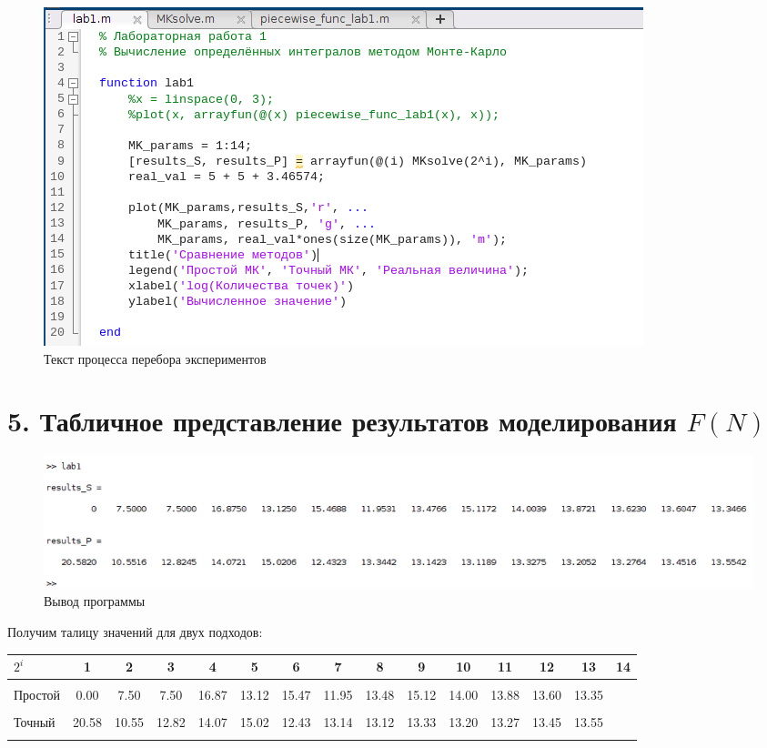 \documentclass[12pt]{article}
\begin{document}
\begin{figure}[!h]
	\centering
	\includegraphics[width=\linewidth]{lab1.png}
	\caption{Текст процесса перебора экспериментов}
\end{figure}


 
\newpage
 \section*{5. Табличное представление результатов моделирования $F(N)$}
 
\begin{figure}[!h]
	\centering
	\includegraphics[width=\linewidth]{output.png}
	\caption{Вывод программы}
\end{figure}
Получим талицу значений для двух подходов:
\begin{center}
	\begin{tabular}[c]{lcccccccccccccc}
  		$2^i$ & 1 & 2 & 3 & 4 & 5 & 6 & 7 & 8 & 9 & 10 & 11 & 12 & 13 & 14\\[2mm]\hline
  		&&&\\
		Простой & 0.00 & 7.50 & 7.50 & 16.87 & 13.12 & 15.47 & 11.95 & 13.48 & 15.12 & 14.00 & 13.88 & 13.60 & 13.35\\
		&&&\\
		Точный & 20.58 & 10.55 & 12.82 & 14.07 & 15.02 & 12.43 & 13.14 & 13.12 & 13.33 & 13.20 & 13.27 & 13.45 & 13.55\\
		&&&\\
	\end{tabular}
\end{center}
\end{document}
